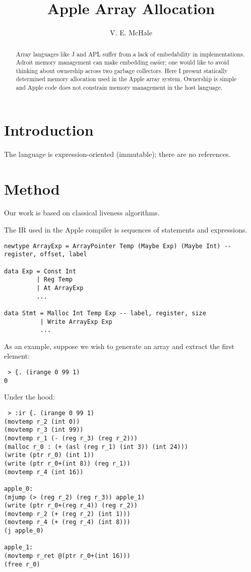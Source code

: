 \documentclass{article}
\begin{document}
\title{Apple Array Allocation}
\author{V. E. McHale}
\maketitle

\begin{abstract}
    Array languages like J and APL suffer from a lack of embedability in implementations. Adroit memory management can make embedding easier; one would like to avoid thinking about ownership across two garbage collectors. Here I present statically determined memory allocation used in the Apple array system. Ownership is simple and Apple code does not constrain memory management in the host language.
\end{abstract}

\section{Introduction}

The language is expression-oriented (immutable); there are no references.

\section{Method}

Our work is based on classical liveness algorithms.

The IR used in the Apple compiler is sequences of statements and expressions.

\begin{verbatim}
newtype ArrayExp = ArrayPointer Temp (Maybe Exp) (Maybe Int) -- register, offset, label

data Exp = Const Int
         | Reg Temp
         | At ArrayExp
         ...

data Stmt = Malloc Int Temp Exp -- label, register, size
          | Write ArrayExp Exp
          ...
\end{verbatim}

As an example, suppose we wish to generate an array and extract the first element:

\begin{verbatim}
 > {. (irange 0 99 1)
0
\end{verbatim}

Under the hood:

\begin{verbatim}
 > :ir {. (irange 0 99 1)
(movtemp r_2 (int 0))
(movtemp r_3 (int 99))
(movtemp r_1 (- (reg r_3) (reg r_2)))
(malloc r_0 : (+ (asl (reg r_1) (int 3)) (int 24)))
(write (ptr r_0) (int 1))
(write (ptr r_0+(int 8)) (reg r_1))
(movtemp r_4 (int 16))

apple_0:
(mjump (> (reg r_2) (reg r_3)) apple_1)
(write (ptr r_0+(reg r_4)) (reg r_2))
(movtemp r_2 (+ (reg r_2) (int 1)))
(movtemp r_4 (+ (reg r_4) (int 8)))
(j apple_0)

apple_1:
(movtemp r_ret @(ptr r_0+(int 16)))
(free r_0)
\end{verbatim}
\end{document}
